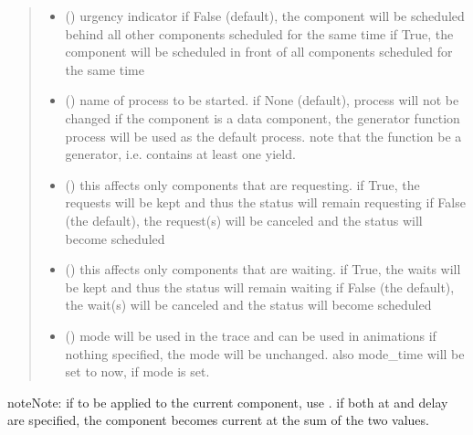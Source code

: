 \documentclass[letterpaper,10pt,english]{sphinxmanual}
\begin{document}
\begin{fulllineitems}
\begin{fulllineitems}
\begin{quote}
\begin{description}
\begin{itemize}
\item {} 
 () \textendash{} urgency indicator 
if False (default), the component will be scheduled
behind all other components scheduled
for the same time 
if True, the component will be scheduled
in front of all components scheduled
for the same time

\item {} 
 () \textendash{} name of process to be started. 
if None (default), process will not be changed 
if the component is a data component, the
generator function process will be used as the default process. 
note that the function  be a generator,
i.e. contains at least one yield.

\item {} 
 () \textendash{} this affects only components that are requesting. 
if True, the requests will be kept and thus the status will remain requesting 
if False (the default), the request(s) will be canceled and the status will become scheduled

\item {} 
 () \textendash{} this affects only components that are waiting. 
if True, the waits will be kept and thus the status will remain waiting 
if False (the default), the wait(s) will be canceled and the status will become scheduled

\item {} 
 () \textendash{} mode 
will be used in the trace and can be used in animations 
if nothing specified, the mode will be unchanged. 
also mode\_time will be set to now, if mode is set.

\end{itemize}

\end{description}\end{quote}

\begin{sphinxadmonition}{note}{Note:}
if to be applied to the current component, use . 
if both at and delay are specified, the component becomes current at the sum
of the two values.
\end{sphinxadmonition}


\end{fulllineitems}
\end{fulllineitems}
\end{document}

